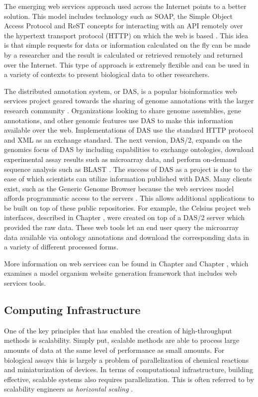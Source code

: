 The emerging web services approach used across the Internet points to a better
solution.  This model includes technology such as SOAP, the Simple Object
Access Protocol and ReST concepts for interacting with an API remotely over the
hypertext transport protocol (HTTP) on which the web is based \cite{rest}.
This idea is that simple requests for data or information calculated on the fly
can be made by a researcher and the result is calculated or retrieved remotely
and returned over the Internet.  This type of approach is extremely flexible
and can be used in a variety of contexts to present biological data to other
researchers.

The distributed annotation system, or DAS, is a popular bioinformatics web
services project geared towards the sharing of genome annotations with the
larger research community \cite{das}.  Organizations looking to share genome
assemblies, gene annotations, and other genomic features use DAS to make this
information available over the web.  Implementations of DAS use the standard
HTTP protocol and XML as an exchange standard.  The next version, DAS/2,
expands on the genomics focus of DAS by including capabilities to exchange
ontologies, download experimental assay results such as microarray data, and
perform on-demand sequence analysis such as BLAST \cite{blast}.  The success of
DAS as a project is due to the ease of which scientists can utilize information
published with DAS.  Many clients exist, such as the Generic Genome Browser
because the web services model affords programmatic access to the servers
\cite{gbrowse, spice}.  This allows additional applications to be built on top
of these public repositories.  For example, the Celsius project web interfaces,
described in Chapter \celsiuschapter, were created on top of a DAS/2 server
which provided the raw data.  These web tools let an end user query the
microarray data available via ontology annotations and download the
corresponding data in a variety of different processed forms.

More information on web services can be found in Chapter \celsiuschapter and
Chapter \gmodwebchapter, which examines a model organism website generation
framework that includes web services tools.

\subsection{Computing Infrastructure}\label{Computing Infrastructure}

One of the key principles that has enabled the creation of high-throughput
methods is scalability.  Simply put, scalable methods are able to process large
amounts of data at the same level of performance as small amounts.  For
biological assays this is largely a problem of parallelization of chemical
reactions and miniaturization of devices.  In terms of computational
infrastructure, building effective, scalable systems also requires
parallelization.  This is often referred to by scalability engineers as
\emph{horizontal scaling} \cite{schlossnagle2006,arlitt2001}.

